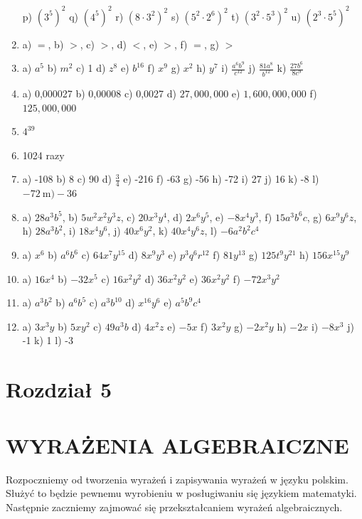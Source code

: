 \documentclass[10pt]{article}
\begin{document}
\begin{enumerate}
p) \(\left(3^{5}\right)^{2}\) q) \(\left(4^{5}\right)^{2}\) r) \(\left(8 \cdot 3^{2}\right)^{2}\) s) \(\left(5^{2} \cdot 2^{6}\right)^{2}\) t) \(\left(3^{2} \cdot 5^{3}\right)^{2}\) u) \(\left(2^{3} \cdot 5^{5}\right)^{2}\)
  \item a) \(=\), b) \(>\), c) \(>\), d) \(<\), e) \(>\), f) \(=\), g) \(>\)
  \item a) \(a^{5}\) b) \(m^{2}\) c) 1 d) \(z^{8}\) e) \(b^{16}\) f) \(x^{9}\) g) \(x^{2}\) h) \(y^{7}\) i) \(\frac{a^{6} b^{9}}{c^{12}}\) j) \(\frac{81 a^{8}}{b^{12}}\) k) \(\frac{27 b^{6}}{8 c^{9}}\)
  \item a) 0,000027 b) 0,00008 c) 0,0027 d) \(27,000,000\) e) \(1,600,000,000\) f) \(125,000,000\)
  \item \(4^{39}\)
  \item 1024 razy
  \item a) -108 b) 8 c) 90 d) \(\frac{3}{4}\) e) -216 f) -63 g) -56 h) -72 i) 27 j) 16 k) -8 l) \(-72 \mathrm{~m})-36\)
  \item a) \(28 a^{3} b^{5}\), b) \(5 w^{2} x^{2} y^{3} z\), c) \(20 x^{3} y^{4}\), d) \(2 x^{6} y^{5}\), e) \(-8 x^{4} y^{3}\), f) \(15 a^{3} b^{6} c\), g) \(6 x^{9} y^{6} z\), h) \(28 a^{3} b^{2}\), i) \(18 x^{4} y^{6}\), j) \(40 x^{6} y^{2}\), k) \(40 x^{4} y^{6} z\), l) \(-6 a^{2} b^{2} c^{4}\)
  \item a) \(x^{6}\) b) \(a^{6} b^{6}\) c) \(64 x^{7} y^{15}\) d) \(8 x^{9} y^{3}\) e) \(p^{3} q^{6} r^{12}\) f) \(81 y^{13}\) g) \(125 t^{9} y^{21}\) h) \(156 x^{15} y^{9}\)
  \item a) \(16 x^{4}\) b) \(-32 x^{5}\) c) \(16 x^{2} y^{2}\) d) \(36 x^{2} y^{2}\) e) \(36 x^{2} y^{2}\) f) \(-72 x^{3} y^{2}\)
  \item a) \(a^{3} b^{2}\) b) \(a^{6} b^{5}\) c) \(a^{3} b^{10}\) d) \(x^{16} y^{6}\) e) \(a^{5} b^{9} c^{4}\)
  \item a) \(3 x^{3} y\) b) \(5 x y^{2}\) c) \(49 a^{3} b\) d) \(4 x^{2} z\) e) \(-5 x\) f) \(3 x^{2} y\) g) \(-2 x^{2} y\) h) \(-2 x\) i) \(-8 x^{3}\) j) -1 k) 1 l) -3
\end{enumerate}

\section*{Rozdział 5}
\section*{WYRAŻENIA ALGEBRAICZNE}
Rozpoczniemy od tworzenia wyrażeń i zapisywania wyrażeń w języku polskim. Służyć to będzie pewnemu wyrobieniu w posługiwaniu się językiem matematyki. Następnie zaczniemy zajmować się przekształcaniem wyrażeń algebraicznych.
\end{document}
